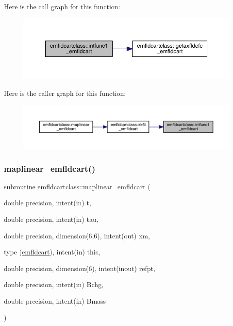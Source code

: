Here is the call graph for this function\+:\nopagebreak
\begin{figure}[H]
\begin{center}
\leavevmode
\includegraphics[width=350pt]{namespaceemfldcartclass_a2a33c1d59a306651080d563b98b844e7_cgraph}
\end{center}
\end{figure}
Here is the caller graph for this function\+:\nopagebreak
\begin{figure}[H]
\begin{center}
\leavevmode
\includegraphics[width=350pt]{namespaceemfldcartclass_a2a33c1d59a306651080d563b98b844e7_icgraph}
\end{center}
\end{figure}
\mbox{\label{namespaceemfldcartclass_a4be4286a2e0f37f64d5fd1973fe73f39}} 
\subsubsection{\texorpdfstring{maplinear\_emfldcart()}{maplinear\_emfldcart()}}
{\footnotesize\ttfamily subroutine emfldcartclass\+::maplinear\+\_\+emfldcart (\begin{DoxyParamCaption}\item[{double precision, intent(in)}]{t,  }\item[{double precision, intent(in)}]{tau,  }\item[{double precision, dimension(6,6), intent(out)}]{xm,  }\item[{type (\mbox{\hyperlink{namespaceemfldcartclass_structemfldcartclass_1_1emfldcart}{emfldcart}}), intent(in)}]{this,  }\item[{double precision, dimension(6), intent(inout)}]{refpt,  }\item[{double precision, intent(in)}]{Bchg,  }\item[{double precision, intent(in)}]{Bmass }\end{DoxyParamCaption})}

